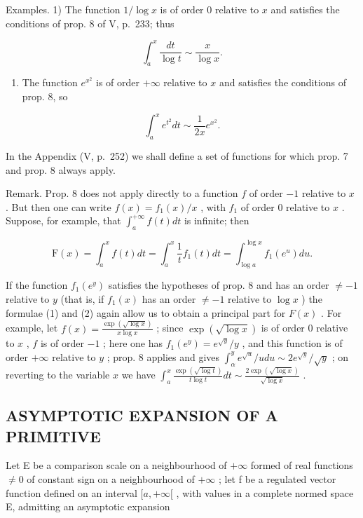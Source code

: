 Examples. 1) The function \(1 / \log x\) is of order 0 relative to \(x\) and satisfies the conditions of prop. 8 of V, p.~233; thus

\[
\int_ {a} ^ {x} \frac {d t}{\log t} \sim \frac {x}{\log x}.
\]

\begin{enumerate}
\def\labelenumi{\arabic{enumi})}
\setcounter{enumi}{1}
\tightlist
\item
  The function \(e^{x^2}\) is of order \(+\infty\) relative to \(x\) and satisfies the conditions of prop. 8, so
\end{enumerate}

\[
\int_ {a} ^ {x} e ^ {t ^ {2}} d t \sim \frac {1}{2 x} e ^ {x ^ {2}}.
\]

In the Appendix (V, p.~252) we shall define a set of functions for which prop. 7 and prop. 8 always apply.

Remark. Prop. 8 does not apply directly to a function \(f\) of order \(-1\) relative to \(x\) . But then one can write \(f(x) = f_1(x) / x\) , with \(f_1\) of order 0 relative to \(x\) . Suppose, for example, that \(\int_{a}^{+\infty} f(t) dt\) is infinite; then

\[
\mathrm{F} (x) = \int_ {a} ^ {x} f (t) d t = \int_ {a} ^ {x} \frac {1}{t} f _ {1} (t) d t = \int_ {\log a} ^ {\log x} f _ {1} \left(e ^ {u}\right) d u.
\]

If the function \(f_{1}(e^{y})\) satisfies the hypotheses of prop. 8 and has an order \(\neq -1\) relative to \(y\) (that is, if \(f_{1}(x)\) has an order \(\neq -1\) relative to \(\log x\) ) the formulae (1) and (2) again allow us to obtain a principal part for \(F(x)\) . For example, let \(f(x) = \frac{\exp(\sqrt{\log x})}{x\log x}\) ; since \(\exp(\sqrt{\log x})\) is of order 0 relative to \(x\) , \(f\) is of order \(-1\) ; here one has \(f_{1}(e^{y}) = e^{\sqrt{y}} / y\) , and this function is of order \(+\infty\) relative to \(y\) ; prop. 8 applies and gives \(\int_{\alpha}^{y} e^{\sqrt{u}} / u du \sim 2e^{\sqrt{y}} / \sqrt{y}\) ; on reverting to the variable \(x\) we have \(\int_{a}^{x} \frac{\exp(\sqrt{\log t})}{t\log t} dt \sim \frac{2\exp(\sqrt{\log x})}{\sqrt{\log x}}\) .

\subsection{ASYMPTOTIC EXPANSION OF A PRIMITIVE}

Let E be a comparison scale on a neighbourhood of \(+\infty\) formed of real functions \(\neq 0\) of constant sign on a neighbourhood of \(+\infty\) ; let f be a regulated vector function defined on an interval \([a, +\infty[\) , with values in a complete normed space E, admitting an asymptotic expansion

